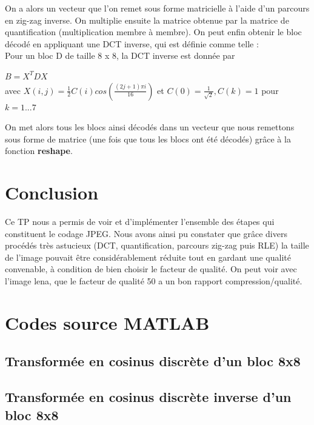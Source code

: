 \documentclass[a4paper, 12pt]{article}
\newcommand{\FSource}[1]{%

}
\begin{document}
On a alors un vecteur que l'on remet sous forme matricielle à l'aide d'un parcours en zig-zag inverse. On multiplie ensuite la matrice obtenue par la matrice de quantification (multiplication membre à membre). On peut enfin obtenir le bloc décodé en appliquant une DCT inverse, qui est définie comme telle :\\

Pour un bloc D de taille 8 x 8, la DCT inverse est donnée par

\begin{center}
$B = X^TDX$\\
avec $X(i,j)=\frac{1}{2}C(i)cos(\frac{(2j+1)\pi i}{16})$ et $C(0) = \frac{1}{\sqrt{2}}, C(k) = 1$ pour $k = 1 ... 7$
\end{center}

On met alors tous les blocs ainsi décodés dans un vecteur que nous remettons sous forme de matrice (une fois que tous les blocs ont été décodés) grâce à la fonction \textbf{reshape}.

\newpage

\section{Conclusion}

Ce TP nous a permis de voir et d'implémenter l'ensemble des étapes qui constituent le codage JPEG. Nous avons ainsi pu constater que grâce divers procédés très astucieux (DCT, quantification, parcours zig-zag puis RLE) la taille de l'image pouvait être considérablement réduite tout en gardant une qualité convenable, à condition de bien choisir le facteur de qualité. On peut voir avec l'image lena, que le facteur de qualité 50 a un bon rapport compression/qualité.\\


\clearpage

%
%
\appendix

\section{Codes source MATLAB}
\subsection{Transformée en cosinus discrète d'un bloc 8x8}\label{dct_code}

\FSource{../MyDCT.m}

\newpage

\subsection{Transformée en cosinus discrète inverse d'un bloc 8x8}\label{idct_code}
\end{document}
